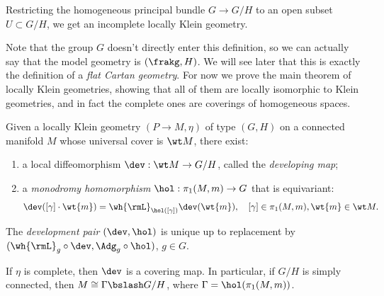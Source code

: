 \begin{example}
    Restricting the homogeneous principal bundle $G\to G\slash H$ to an open subset $U\subset G\slash H$, we get an incomplete locally Klein geometry.
\end{example}

Note that the group $G$ doesn't directly enter this definition, so we can actually say that the model geometry is $(\frakg,H)$. We will see later that this is exactly the definition of a \emph{flat Cartan geometry}. For now we prove the main theorem of locally Klein geometries, showing that all of them are locally isomorphic to Klein geometries, and in fact the complete ones are coverings of homogeneous spaces.

\begin{thm}\label{prop locally klein}
    Given a locally Klein geometry $(P\to M,\eta)$ of type $(G,H)$ on a connected manifold $M$ whose universal cover is $\wt M$, there exist:
    \begin{enumerate}
        \item a local diffeomorphism $\dev: \wt M\to G\slash H$, called the \emph{developing map};
        \item a \emph{monodromy homomorphism} $\hol:\pi_1(M,m)\to G$ that is equivariant: 
        \[\dev([\gamma]\cdot \wt{m})=\wh{\rmL}_{\hol([\gamma])}\dev(\wt{m}),\quad [\gamma]\in \pi_1(M,m),\wt{m}\in\wt M.\]
    \end{enumerate} 
    The \emph{development pair} $(\dev,\hol)$ is unique up to replacement by $(\wh{\rmL}_g\circ \dev,\Adg_g\circ\hol)$, $g\in G$.

    If $\eta$ is complete, then $\dev$ is a covering map. In particular, if $G\slash H$ is simply connected, then $M\cong \Gamma\bslash G\slash H$, where $\Gamma=\hol(\pi_1(M,m))$.
\end{thm}
